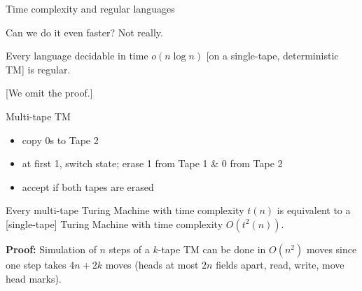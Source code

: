 \documentclass[handout]{beamer}
\begin{document}
\begin{frame}{Time complexity and regular languages}
    
    Can we do it even faster? Not really.

    \begin{theorem}
        Every language decidable in time $o(n \log n)$ [on a single-tape, deterministic TM] is regular. %
    \end{theorem}

    [We omit the proof.]

\end{frame}

    
\begin{frame}{Multi-tape TM}
    
    \begin{example}[Multi-tape TM for $L=\{0^i1^i \mid  i\geq 0\}$]
        \begin{itemize}
            \item copy 0s to Tape 2
            \item at first 1, switch state; erase 1 from Tape 1 \& 0 from Tape 2
            \item accept if both tapes are erased
        \end{itemize}

    \end{example}
    
    \begin{lemma}
        Every multi-tape Turing Machine with time complexity $t(n)$ is equivalent to a [single-tape] Turing Machine with time complexity $O(t^2(n))$.
    \end{lemma}
    \textbf{Proof:} Simulation of $n$ steps of a $k$-tape TM can be done in $O(n^2)$ moves since one step takes $4n+2k$ moves (heads at most $2n$ fields apart, read, write, move head marks).\hfill\qedsymbol

\end{frame}
\end{document}
